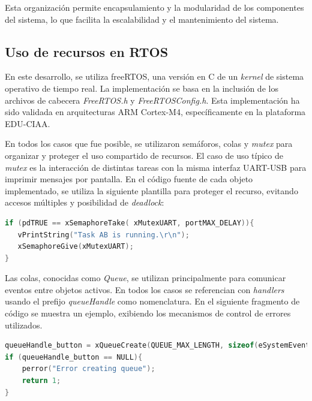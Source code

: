 Esta organización permite encapsulamiento y la modularidad de los componentes del sistema, lo que facilita la escalabilidad y el mantenimiento del sistema.\\

\subsection{Uso de recursos en RTOS}

En este desarrollo, se utiliza freeRTOS, una versión en C de un \textit{kernel} de sistema operativo de tiempo real. La implementación se basa en la inclusión de los archivos de cabecera \textit{FreeRTOS.h} y \textit{FreeRTOSConfig.h}. Esta implementación ha sido validada en arquitecturas ARM Cortex-M4, específicamente en la plataforma EDU-CIAA. 

En todos los casos que fue posible, se utilizaron semáforos, colas y \textit{mutex} para organizar y proteger el uso compartido de recursos. El caso de uso típico de \textit{mutex} es la interacción de distintas tareas con la misma interfaz UART-USB para imprimir mensajes por pantalla. En el código fuente de cada objeto implementado, se utiliza la siguiente plantilla para proteger el recurso, evitando accesos múltiples y posibilidad de \textit{deadlock}:\\

\begin{lstlisting}[caption=Ejemplo de protección de recursos compartidos.,
	language=C, 
	backgroundcolor=\color{mygray},
	]
if (pdTRUE == xSemaphoreTake( xMutexUART, portMAX_DELAY)){
   vPrintString("Task AB is running.\r\n");
   xSemaphoreGive(xMutexUART);
}
\end{lstlisting}

Las colas, conocidas como \textit{Queue}, se utilizan principalmente para comunicar eventos entre objetos activos. En todos los casos se referencian con \textit{handlers} usando el prefijo \textit{queueHandle} como nomenclatura. En el siguiente fragmento de código se muestra un ejemplo, exibiendo los mecanismos de control de errores utilizados. \\

\begin{lstlisting}[caption=Ejemplo de creación de cola.,
	language=C, 
	backgroundcolor=\color{mygray},
	]
queueHandle_button = xQueueCreate(QUEUE_MAX_LENGTH, sizeof(eSystemEvent_button));
if (queueHandle_button == NULL){
    perror("Error creating queue");
    return 1;
}
\end{lstlisting}


